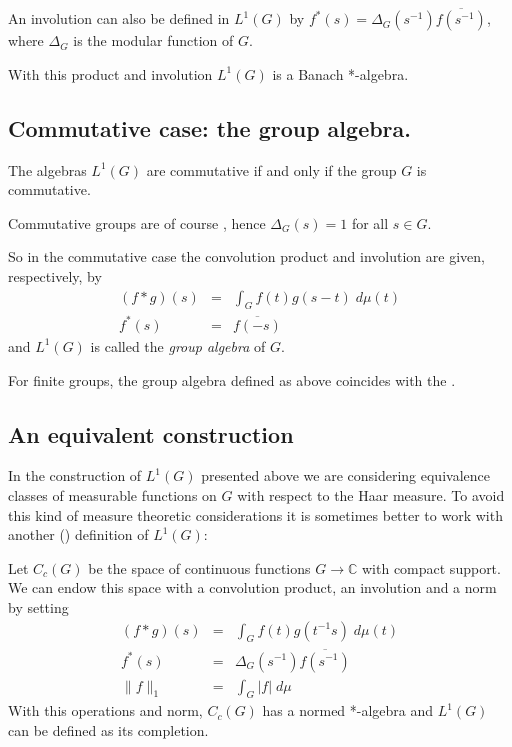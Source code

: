 \documentclass[12pt]{article}
\begin{document}
An involution can also be defined in $L^1(G)$ by $f^*(s) = \Delta_G(s^{-1})\overline{f(s^{-1})}$, where $\Delta_G$ is the modular function of $G$.

With this product and involution $L^1(G)$ is a Banach *-algebra.

\subsection{Commutative case: the group algebra.}

The algebras $L^1(G)$ are commutative if and only if the group $G$ is commutative.

Commutative groups are of course , hence $\Delta_G (s) = 1$ for all $s \in G$.

So in the commutative case the convolution product and involution are given, respectively, by
\begin{eqnarray*}
(f * g)(s) & = & \int_G f(t)g(s-t)\;d\mu(t)\\
f^*(s) & = & \overline{f(-s)}
\end{eqnarray*}
and $L^1(G)$ is called the \emph{group algebra} of $G$.

For finite groups, the group algebra defined as above coincides with the .

\subsection{An equivalent construction}
In the construction of $L^1(G)$ presented above we are considering equivalence classes of measurable functions on $G$ with respect to the Haar measure. To avoid this kind of measure theoretic considerations it is sometimes better to work with another () definition of $L^1(G)$:

Let $C_c(G)$ be the space of continuous functions $G \longrightarrow \mathbb{C}$ with compact support. We can endow this space with a convolution product, an involution and a norm by setting
\begin{eqnarray*}
(f * g)(s) & = & \int_G f(t)g(t^{-1}s)\;d\mu(t)\\
f^*(s) & = & \Delta_G(s^{-1})\overline{f(s^{-1})}\\
\|f\|_1 & = & \int_G |f|\; d\mu
\end{eqnarray*}
With this operations and norm, $C_c(G)$ has a normed *-algebra  and $L^1(G)$ can be defined as its completion.
\end{document}
